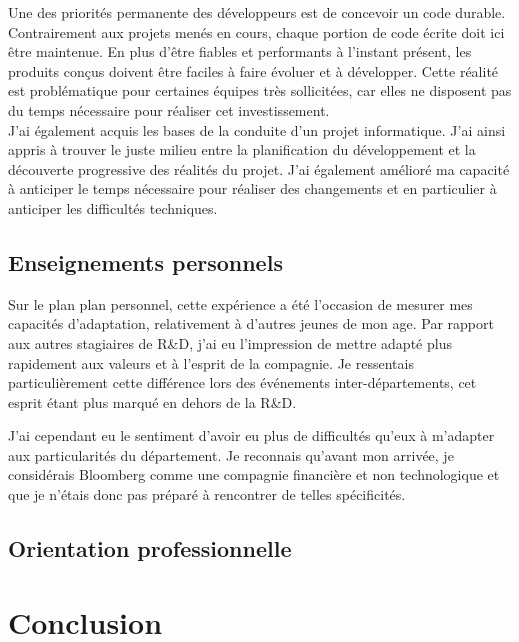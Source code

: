 \documentclass[11pt, oneside, titlepage, a4paper]{article}
\begin{document}
Une des priorités permanente des développeurs est de concevoir un code durable. Contrairement aux projets menés en cours, chaque portion de code écrite doit ici être maintenue. En plus d'être fiables et performants à l'instant présent, les produits conçus doivent être faciles à faire évoluer et à développer. Cette réalité est problématique pour certaines équipes très sollicitées, car elles ne disposent pas du temps nécessaire pour réaliser cet investissement.
\\

J'ai également acquis les bases de la conduite d'un projet informatique. J'ai ainsi appris à trouver le juste milieu entre la planification du développement et la découverte progressive des réalités du projet. J'ai également amélioré ma capacité à anticiper le temps nécessaire pour réaliser des changements et en particulier à anticiper les difficultés techniques.
	\subsection{Enseignements personnels} \label{ensperso}
Sur le plan plan personnel, cette expérience a été l'occasion de mesurer mes capacités d'adaptation, relativement à d'autres jeunes de mon age. Par rapport aux autres stagiaires de R\&D, j'ai eu l'impression de mettre adapté plus rapidement aux valeurs et à l'esprit de la compagnie. Je ressentais particulièrement cette différence lors des événements inter-départements, cet esprit étant plus marqué en dehors de la R\&D.

J'ai cependant eu le sentiment d'avoir eu plus de difficultés qu'eux à m'adapter aux particularités du département. Je reconnais qu'avant mon arrivée, je considérais Bloomberg comme une compagnie financière et non technologique et que je n'étais donc pas préparé à rencontrer de telles spécificités.
\\

	\subsection{Orientation professionnelle}
\newpage
\section{Conclusion}
\end{document}
